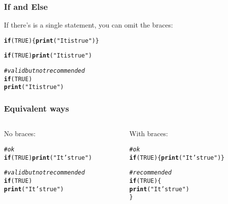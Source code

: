 \documentclass[12pt]{beamer}\usepackage[]{graphicx}\usepackage[]{color}
\makeatletter
\newcommand{\hlnum}[1]{\textcolor[rgb]{0.686,0.059,0.569}{#1}}%
\newcommand{\hlstr}[1]{\textcolor[rgb]{0.192,0.494,0.8}{#1}}%
\newcommand{\hlcom}[1]{\textcolor[rgb]{0.678,0.584,0.686}{\textit{#1}}}%
\newcommand{\hlstd}[1]{\textcolor[rgb]{0.345,0.345,0.345}{#1}}%
\newcommand{\hlkwa}[1]{\textcolor[rgb]{0.161,0.373,0.58}{\textbf{#1}}}%
\newcommand{\hlkwd}[1]{\textcolor[rgb]{0.737,0.353,0.396}{\textbf{#1}}}%
\newenvironment{kframe}{%
 \def\at@end@of@kframe{}%
 \ifinner\ifhmode%
  \def\at@end@of@kframe{\end{minipage}}%
  \begin{minipage}{\columnwidth}%
 \fi\fi%
 \def\FrameCommand##1{\hskip\@totalleftmargin \hskip-\fboxsep
 \colorbox{shadecolor}{##1}\hskip-\fboxsep
     \hskip-\linewidth \hskip-\@totalleftmargin \hskip\columnwidth}%
 \MakeFramed {\advance\hsize-\width
   \@totalleftmargin\z@ \linewidth\hsize
   \@setminipage}}%
 {\par\unskip\endMakeFramed%
 \at@end@of@kframe}
\newenvironment{knitrout}{}{} %
\makeatother
\begin{document}

\begin{frame}[fragile]
\frametitle{If and Else}

If there's is a single statement, you can omit the braces:
\begin{knitrout}\footnotesize
{}\color{fgcolor}\begin{kframe}
\begin{alltt}
\hlkwa{if} \hlstd{(}\hlnum{TRUE}\hlstd{) \{} \hlkwd{print}\hlstd{(}\hlstr{"It is true"}\hlstd{) \}}

\hlkwa{if} \hlstd{(}\hlnum{TRUE}\hlstd{)} \hlkwd{print}\hlstd{(}\hlstr{"It is true"}\hlstd{)}

\hlcom{# valid but not recommended}
\hlkwa{if} \hlstd{(}\hlnum{TRUE}\hlstd{)}
  \hlkwd{print}\hlstd{(}\hlstr{"It is true"}\hlstd{)}
\end{alltt}
\end{kframe}
\end{knitrout}

\end{frame}


\begin{frame}[fragile]
\frametitle{Equivalent ways}

\begin{columns}[t]
\begin{column}{0.45\textwidth}
No braces:
\begin{knitrout}\footnotesize
{}\color{fgcolor}\begin{kframe}
\begin{alltt}
\hlcom{# ok}
\hlkwa{if} \hlstd{(}\hlnum{TRUE}\hlstd{)} \hlkwd{print}\hlstd{(}\hlstr{"It's true"}\hlstd{)}


\hlcom{# valid but not recommended}
\hlkwa{if} \hlstd{(}\hlnum{TRUE}\hlstd{)}
  \hlkwd{print}\hlstd{(}\hlstr{"It's true"}\hlstd{)}
\end{alltt}
\end{kframe}
\end{knitrout}
\end{column}

\begin{column}{0.45\textwidth}
With braces:
\begin{knitrout}\footnotesize
{}\color{fgcolor}\begin{kframe}
\begin{alltt}
\hlcom{# ok}
\hlkwa{if} \hlstd{(}\hlnum{TRUE}\hlstd{) \{}\hlkwd{print}\hlstd{(}\hlstr{"It's true"}\hlstd{)\}}


\hlcom{# recommended}
\hlkwa{if} \hlstd{(}\hlnum{TRUE}\hlstd{) \{}
  \hlkwd{print}\hlstd{(}\hlstr{"It's true"}\hlstd{)}
\hlstd{\}}
\end{alltt}
\end{kframe}
\end{knitrout}
\end{column}
\end{columns}

\end{frame}
\end{document}
